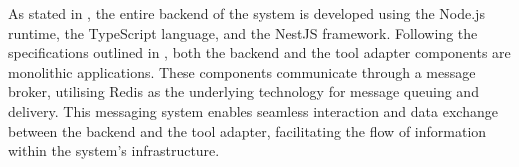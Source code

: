 As stated in , the entire backend of the system is
developed using the Node.js runtime, the TypeScript language, and the NestJS
framework. Following the specifications outlined in ,
both the backend and the tool adapter components are monolithic applications.
These components communicate through a message broker, utilising Redis as the
underlying technology for message queuing and delivery. This messaging system
enables seamless interaction and data exchange between the backend and the tool
adapter, facilitating the flow of information within the system's
infrastructure.
